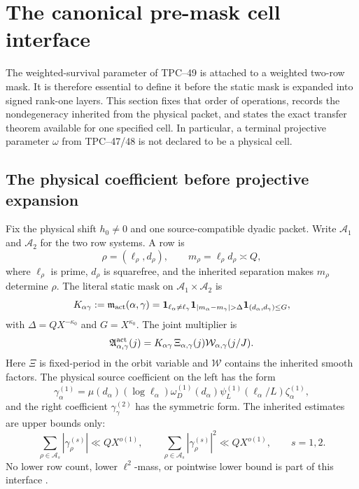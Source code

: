 \section{The canonical pre-mask cell interface}
\label{sec:tpc50-canonical-interface}

The weighted-survival parameter of TPC--49 is attached to a weighted
two-row mask.  It is therefore essential to define it before the static
mask is expanded into signed rank-one layers.  This section fixes that
order of operations, records the nondegeneracy inherited from the
physical packet, and states the exact transfer theorem available for one
specified cell.  In particular, a terminal projective parameter
\(\omega\) from TPC--47/48 is not declared to be a physical cell.

\subsection{The physical coefficient before projective expansion}

Fix the physical shift \(h_0\ne0\) and one source-compatible dyadic
packet.  Write \(\mathcal A_1\) and \(\mathcal A_2\) for the two row
systems.  A row is
\begin{equation}
 \rho=(\ell_\rho,d_\rho),
 \qquad m_\rho=\ell_\rho d_\rho\asymp Q,
 \label{eq:tpc50-physical-row}
\end{equation}
where \(\ell_\rho\) is prime, \(d_\rho\) is squarefree, and the inherited
separation makes \(m_\rho\) determine \(\rho\).  The literal static mask
on \(\mathcal A_1\times\mathcal A_2\) is
\begin{equation}
 K_{\alpha\gamma}
 :=\mathfrak m_{\rm act}(\alpha,\gamma)
 =\mathbf 1_{\ell_\alpha\ne\ell_\gamma}
  \mathbf 1_{|m_\alpha-m_\gamma|>\Delta}
  \mathbf 1_{(d_\alpha,d_\gamma)\le G},
 \label{eq:tpc50-literal-static-mask}
\end{equation}
with \(\Delta=QX^{-\kappa_0}\) and \(G=X^{\kappa_0}\).  The joint
multiplier is
\begin{equation}
 \mathfrak A_{\alpha,\gamma}^{\rm act}(j)
 =K_{\alpha\gamma}\,
  \Xi_{\alpha,\gamma}(j)
  \mathcal W_{\alpha,\gamma}(j/J).
 \label{eq:tpc50-joint-multiplier}
\end{equation}
Here \(\Xi\) is fixed-period in the orbit variable and \(\mathcal W\)
contains the inherited smooth factors.  The physical source coefficient
on the left has the form
\begin{equation}
 \gamma_\alpha^{(1)}
 =\mu(d_\alpha)(\log\ell_\alpha)
  \omega_D^{(1)}(d_\alpha)
  \psi_L^{(1)}(\ell_\alpha/L)\zeta_\alpha^{(1)},
 \label{eq:tpc50-left-source-weight}
\end{equation}
and the right coefficient \(\gamma_\gamma^{(2)}\) has the symmetric
form.  The inherited estimates are upper bounds only:
\begin{equation}
 \sum_{\rho\in\mathcal A_s}|\gamma_\rho^{(s)}|
 \ll QX^{o(1)},
 \qquad
 \sum_{\rho\in\mathcal A_s}|\gamma_\rho^{(s)}|^2
 \ll QX^{o(1)},
 \qquad s=1,2.
 \label{eq:tpc50-inherited-row-upper-bounds}
\end{equation}
No lower row count, lower \(\ell^2\)-mass, or pointwise lower bound is
part of this interface \citep{WangTPC36,WangTPC45,WangTPC47,WangTPC48}.

